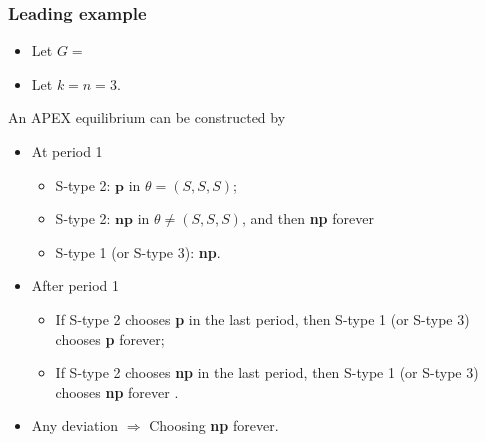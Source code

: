 \documentclass[9pt]{beamer}
\begin{document}
\begin{frame}
  \frametitle{Leading example}
\begin{itemize}
\item Let $G=$
\begin{center}
\end{center}
\item Let $k=n=3$.
\end{itemize}
  
An APEX equilibrium can be constructed by
\begin{itemize}



\item At period 1
\begin{itemize}
\item S-type 2: $\textbf{p}$ in $\theta=(S,S,S)$;
\item S-type 2: $\textbf{np}$ in $\theta\neq (S,S,S)$, and then \alert<2>{\textbf{np} forever}
\item S-type 1 (or S-type 3): \textbf{np}.
\end{itemize}

\item After period 1
\begin{itemize}
\item If S-type 2 chooses \textbf{p} in the last period, then S-type 1 (or S-type 3) chooses \textbf{p} forever; 
\item If S-type 2 chooses \textbf{np} in the last period, then S-type 1 (or S-type 3) chooses \alert<2>{\textbf{np} forever }.
\end{itemize}
 
 \item Any deviation $\Rightarrow$ Choosing \alert<2>{\textbf{np} forever}.
\end{itemize}

\end{frame}
\end{document}
